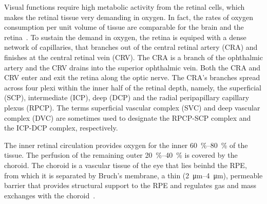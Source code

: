 \documentclass[12pt,a4paper]{journal}
\begin{document}
Visual functions require high metabolic activity from the retinal cells, which makes the retinal tissue very demanding in oxygen.
In fact, the rates of oxygen consumption per unit volume of tissue are comparable for the brain and the retina~\cite{Medrano1995}.
To sustain the demand in oxygen, the retina is equiped with a dense network of capillaries, that branches out of the central retinal artery (CRA) and finishes at the central retinal vein (CRV).
The CRA is a branch of the ophthalmic artery and the CRV drains into the superior ophthalmic vein.
Both the CRA and CRV enter and exit the retina along the optic nerve.
The CRA's branches spread across four plexi within the inner half of the retinal depth, namely, the superficial (SCP), intermediate (ICP), deep (DCP) and the radial peripapillary capillary plexus (RPCP).
The terms superficial vascular complex (SVC) and deep vascular complex (DVC) are sometimes used to designate the RPCP-SCP complex and the ICP-DCP complex, respectively.

The inner retinal circulation provides oxygen for the inner \SIrange{60}{80}{\percent} of the tissue.
The perfusion of the remaining outer \SIrange{20}{40}{\percent} is covered by the choroid.
The choroid is a vascular tissue of the eye that lies beinhd the RPE, from which it is separated by Bruch's membrane, a thin (\SIrange{2}{4}{\micro\meter}), permeable barrier that provides structural support to the RPE and regulates gas and mass exchanges with the choroid~\cite{Curcio2013}.
\end{document}
